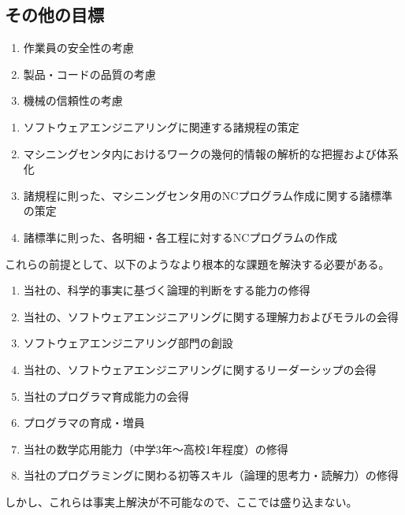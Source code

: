 \subsection{その他の目標}
\begin{enumerate}[label=\sarrow]
\item 作業員の安全性の考慮
\item 製品・コードの品質の考慮
\item 機械の信頼性の考慮
\end{enumerate}



\clearpage
\begin{enumerate}[label=\sarrow]
\item ソフトウェアエンジニアリングに関連する諸規程の策定
\item マシニングセンタ内におけるワークの幾何的情報の解析的な把握および体系化
\item 諸規程に則った、マシニングセンタ用のNCプログラム作成に関する諸標準の策定
\item 諸標準に則った、各明細・各工程に対するNCプログラムの作成
\end{enumerate}
\begin{hosoku}
これらの前提として、以下のようなより根本的な課題を解決する必要がある。
\begin{enumerate}[label=\sarrow]
\item[{\sarrow[red]}] 当社の、科学的事実に基づく論理的判断をする能力の修得
\item[{\sarrow[red]}] 当社の、ソフトウェアエンジニアリングに関する理解力およびモラルの会得
\item[{\sarrow[red]}] ソフトウェアエンジニアリング部門の創設
\item[{\sarrow[red]}] 当社の、ソフトウェアエンジニアリングに関するリーダーシップの会得
\item[{\sarrow[red]}] 当社のプログラマ育成能力の会得
\item[{\sarrow[red]}] プログラマの育成・増員
\item[{\sarrow[red]}] 当社の数学応用能力（中学3年～高校1年程度）の修得
\item[{\sarrow[red]}] 当社のプログラミングに関わる初等スキル（論理的思考力・読解力）の修得
\end{enumerate}
しかし、これらは事実上解決が不可能なので、ここでは盛り込まない。
\end{hosoku}


